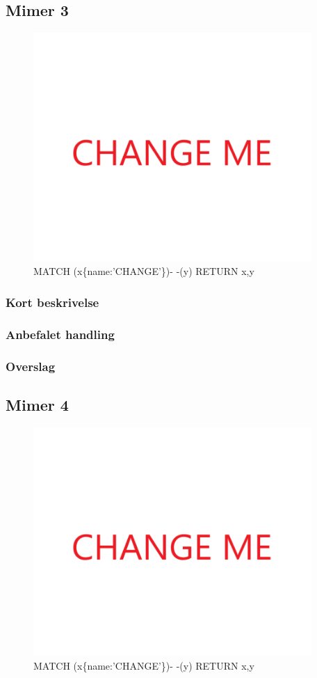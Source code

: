 \documentclass{article}
\begin{document}
\subsection{Mimer 3}
\begin{figure}[h]
\includegraphics[width=300pt]{CHANGE.PNG}
\caption{MATCH (x\{name:'CHANGE'\})- -(y) RETURN x,y}
\end{figure}
\subsubsection{Kort beskrivelse}
\subsubsection{Anbefalet handling}
\subsubsection{Overslag}
\subsection{Mimer 4}
\begin{figure}[h]
\includegraphics[width=300pt]{CHANGE.PNG}
\caption{MATCH (x\{name:'CHANGE'\})- -(y) RETURN x,y}
\end{figure}
\end{document}

